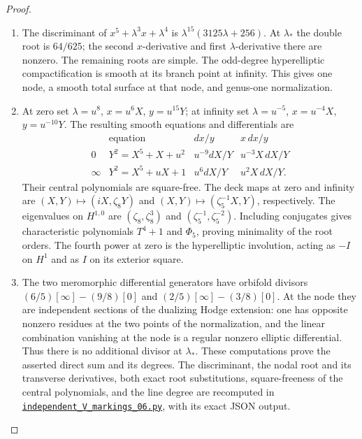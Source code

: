 \begin{proof}
\begin{enumerate}[label={$\langle1\rangle$\arabic*.}]
\item The discriminant of $x^5+\lambda^3x+\lambda^4$ is
$\lambda^{15}(3125\lambda+256)$.
At $\lambda_*$ the double root is $64/625$;
the second $x$-derivative and first $\lambda$-derivative there are
nonzero.  The remaining roots are simple.  The odd-degree
hyperelliptic compactification is smooth at its branch point at
infinity.  This gives one node, a smooth total surface at that node,
and genus-one normalization.

\item At zero set $\lambda=u^8$, $x=u^6X$, $y=u^{15}Y$; at infinity set
$\lambda=u^{-5}$, $x=u^{-4}X$, $y=u^{-10}Y$.
The resulting smooth equations and differentials are
\[
\begin{array}{c|c|c|c}
 &\text{equation}&dx/y&x\,dx/y\\\hline
0&Y^2=X^5+X+u^2&u^{-9}dX/Y&u^{-3}X\,dX/Y\\
\infty&Y^2=X^5+uX+1&u^6dX/Y&u^2X\,dX/Y.
\end{array}
\]
Their central polynomials are square-free.  The deck maps at zero and
infinity are $(X,Y)\mapsto(iX,\zeta_8Y)$ and
$(X,Y)\mapsto(\zeta_5^{-1}X,Y)$, respectively.
The eigenvalues on $H^{1,0}$ are $(\zeta_8,\zeta_8^3)$ and
$(\zeta_5^{-1},\zeta_5^{-2})$.  Including conjugates gives characteristic
polynomials $T^4+1$ and $\Phi_5$, proving minimality of the root orders.
The fourth power at zero is the hyperelliptic involution, acting as
$-I$ on $H^1$ and as $I$ on its exterior square.

\item The two meromorphic differential generators have orbifold divisors
$(6/5)[\infty]-(9/8)[0]$ and
$(2/5)[\infty]-(3/8)[0]$.
At the node they are independent sections of the dualizing Hodge
extension: one has opposite nonzero residues at the two points of the
normalization, and the linear combination vanishing at the node is a
regular nonzero elliptic differential.  Thus there is no additional
divisor at $\lambda_*$.  These computations prove the asserted direct
sum and its degrees.  The discriminant, the nodal root and its transverse derivatives,
both exact root substitutions, square-freeness of the central polynomials,
and the line degree are recomputed in
\href{https://github.com/KokunoYumeto/s6-complex-structure-workbench/blob/83d76022bcd442278b760db9ff438afceed6c6ea/pro_returns/S6_SERIES_GRIND_checkpoint_10_20261120T0211Z/code/current_audits/audit_corrections/code/independent_V_markings_06.py}{\texttt{independent\_V\_markings\_06.py}}, with its exact JSON output.

\end{enumerate}
\end{proof}









